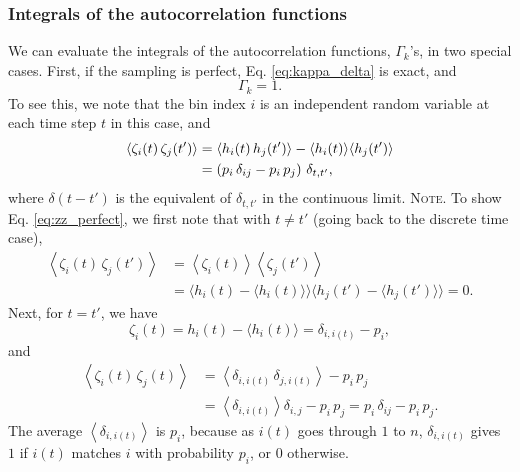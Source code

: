 \documentclass[reprint, floatfix]{revtex4-1}
\newcommand{\note}[1]{{\color{DarkGreen}\footnotesize \textsc{Note.} #1}}
\begin{document}
\subsubsection{\label{sec:Gamma}
Integrals of the autocorrelation functions}



We can evaluate the integrals of the autocorrelation functions,
$\Gamma_k$'s,
in two special cases.
%
First, if the sampling is perfect,
Eq. \eqref{eq:kappa_delta} is exact, and
%
\begin{equation}
  \Gamma_k = 1.
  \label{eq:Gamma_perfect}
\end{equation}
%
To see this, we note that
the bin index $i$ is an independent random variable
at each time step $t$ in this case, and
%
\begin{align}
  \left\langle
    \zeta_i(t) \, \zeta_j(t')
  \right\rangle
  &=
  \langle h_i(t) \, h_j(t') \rangle
  -
  \langle h_i(t) \rangle
  \langle h_j(t') \rangle
  \notag
  \\
  &=
  \left( p_i \, \delta_{ij} - p_i \, p_j \right) \,
  \delta_{t, t'}
  ,
  \label{eq:zz_perfect}
\end{align}
%
where $\delta(t - t')$ is the equivalent of $\delta_{t, t'}$
in the continuous limit.
%
\note{To show Eq. \eqref{eq:zz_perfect}, we first note that
  with $t \ne t'$ (going back to the discrete time case),
  $$
  \begin{aligned}
  \left\langle
    \zeta_i(t) \, \zeta_j(t')
  \right\rangle
  &=
  \left\langle
    \zeta_i(t)
  \right\rangle
  \left\langle
    \zeta_j(t')
  \right\rangle
  \\
  &=
  \bigl\langle h_i(t)  - \langle h_i(t)  \rangle \bigr\rangle
  \bigl\langle h_j(t') - \langle h_j(t') \rangle \bigr\rangle
  =
  0.
  \end{aligned}
  $$
  Next, for $t = t'$, we have
  $$
  \zeta_i(t)
  = h_i(t) - \langle h_i(t) \rangle
  = \delta_{i, i(t)} - p_i,
  $$
  and
  $$
  \begin{aligned}
  \left\langle
    \zeta_i(t) \, \zeta_j(t)
  \right\rangle
  &=
  \left\langle
    \delta_{i, i(t)} \, \delta_{j, i(t)}
  \right\rangle
  -
  p_i \, p_j
  \\
  &=
  \left\langle
    \delta_{i, i(t)}
  \right\rangle
  \delta_{i, j}
  -
  p_i \, p_j
  =
  p_i \, \delta_{ij}
  - p_i \, p_j.
  \end{aligned}
  $$
  The average
  $\left\langle \delta_{i, i(t)} \right\rangle$ is $p_i$,
  because as $i(t)$ goes through $1$ to $n$,
  $\delta_{i, i(t)}$ gives $1$
  if $i(t)$ matches $i$ with probability $p_i$,
  or $0$ otherwise.
}
\end{document}

